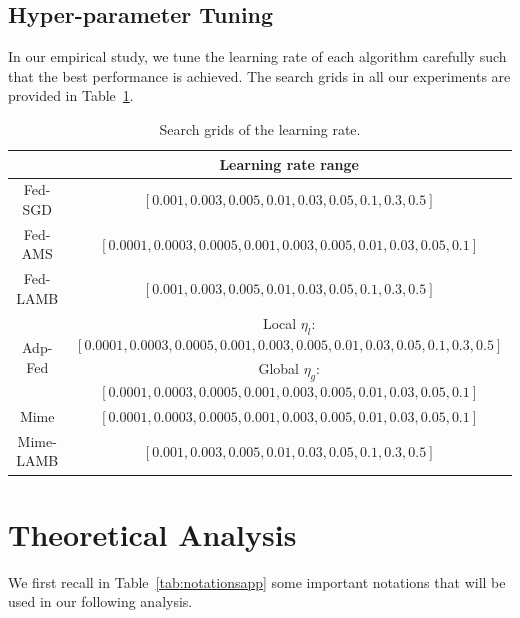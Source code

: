 \documentclass[nohyperref]{article}
\theoremstyle{plain}
\theoremstyle{definition}
\theoremstyle{remark}
\begin{document}
\subsection{Hyper-parameter Tuning}

In our empirical study, we tune the learning rate of each algorithm carefully such that the best performance is achieved. The search grids in all our experiments are provided in Table~{\ref{tab:tuning}}. 

\begin{table}[h]
\centering
\caption{Search grids of the learning rate.}\label{tab:tuning}
\begin{tabular}{c|c}
\toprule[1pt]
 & Learning rate range     \\ \hline  
Fed-SGD                  & $[0.001,0.003,0.005,0.01,0.03,0.05,0.1,0.3,0.5]$                      \\\hline 
Fed-AMS                  & $[0.0001,0.0003,0.0005,0.001,0.003,0.005,0.01,0.03,0.05,0.1]$ \\\hline 
Fed-LAMB     & $[0.001,0.003,0.005,0.01,0.03,0.05,0.1,0.3,0.5]$                      \\\hline 
\multirow{2}{*}{Adp-Fed} & Local $\eta_l$: $[0.0001,0.0003,0.0005,0.001,0.003,0.005,0.01,0.03,0.05,0.1,0.3,0.5]$      \\
    & Global $\eta_g$: $[0.0001,0.0003,0.0005,0.001,0.003,0.005,0.01,0.03,0.05,0.1]$ \\\hline 
Mime                  & $[0.0001,0.0003,0.0005,0.001,0.003,0.005,0.01,0.03,0.05,0.1]$ \\\hline 
Mime-LAMB     & $[0.001,0.003,0.005,0.01,0.03,0.05,0.1,0.3,0.5]$                      \\
\toprule[1pt]
\end{tabular}

\end{table}



\newpage

\section{Theoretical Analysis}\label{app:proofs}

We first recall in Table~\ref{tab:notationsapp} some important notations that will be used in our following analysis.
 
\end{document}
